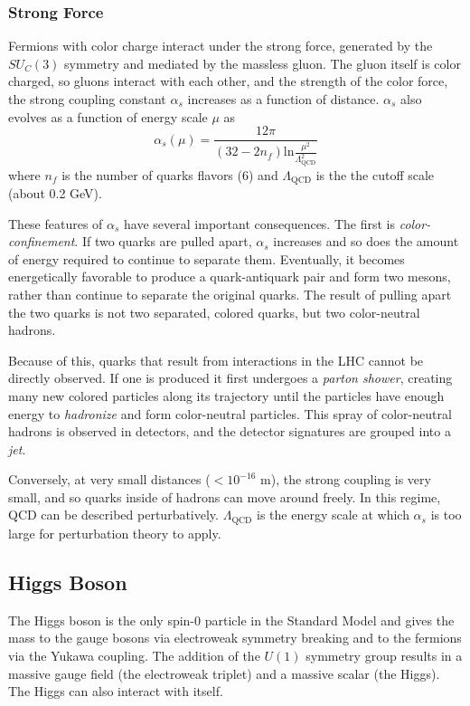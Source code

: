 \subsubsection{Strong Force}
Fermions with color charge interact under the strong force, generated by the $SU_{C}(3)$ symmetry and mediated by the massless gluon. The gluon itself is color charged, so gluons interact with each other, and the strength of the color force, the strong coupling constant $\alpha_s$ increases as a function of distance.  $\alpha_s$ also evolves as a function of energy scale $\mu$ as
\begin{equation}
\alpha_s(\mu)= \frac{12\pi}{(32-2n_f)\text{ln}\frac{\mu^2}{\Lambda^2_{\text{QCD}}}}
\end{equation}
where $n_f$ is the number of quarks flavors (6) and $\Lambda_{\text{QCD}}$ is the the cutoff scale (about 0.2 GeV).



These features of $\alpha_s$ have several important consequences. The first is \emph{color-confinement}. If two quarks are pulled apart, $\alpha_s$ increases and so does the amount of energy required to continue to separate them. Eventually, it becomes energetically favorable to produce a quark-antiquark pair and form two mesons, rather than continue to separate the original quarks. The result of pulling apart the two quarks is not two separated, colored quarks, but two color-neutral hadrons.

Because of this, quarks that result from interactions in the \ac{LHC} cannot be directly observed. If one is produced it first undergoes a \emph{parton shower}, creating many new colored particles along its trajectory until the particles have enough energy to \emph{hadronize} and form color-neutral particles. This spray of color-neutral hadrons is observed in detectors, and the detector signatures are grouped into a \emph{jet}.

Conversely, at very small distances ($< 10^{-16}$ m), the strong coupling is very small, and so quarks inside of hadrons can move around freely. In this regime, \ac{QCD} can be described perturbatively. $\Lambda_{\text{QCD}}$ is the energy scale at which $\alpha_s$ is too large for perturbation theory to apply.


\subsection{Higgs Boson}

The Higgs boson is the only spin-0 particle in the Standard Model and gives the mass to the gauge bosons via electroweak symmetry breaking and to the fermions via the Yukawa coupling. The addition of the $U(1)$ symmetry group results in a massive gauge field (the electroweak triplet) and a massive scalar (the Higgs). The Higgs can also interact with itself.

